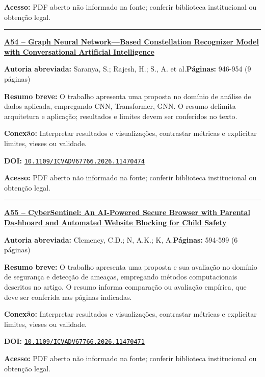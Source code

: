 \documentclass[10pt,a4paper]{article}
\begin{document}
\textbf{Acesso:} PDF aberto não informado na fonte; conferir biblioteca institucional ou obtenção legal.\par
\noindent\rule{\textwidth}{0.35pt}
\par\medskip\noindent
{\large\bfseries\href{https://doi.org/10.1109/ICVADV67766.2026.11470474}{A54 -- Graph Neural Network—Based Constellation Recognizer Model with Conversational Artificial Intelligence}}\par\smallskip
\textbf{Autoria abreviada:} Saranya, S.; Rajesh, H.; S., A. et al.\quad \textbf{Páginas:} 946-954 (9 páginas)\par
\textbf{Resumo breve:} O trabalho apresenta uma proposta no domínio de análise de dados aplicada, empregando CNN, Transformer, GNN. O resumo delimita arquitetura e aplicação; resultados e limites devem ser conferidos no texto.\par
\textbf{Conexão:} Interpretar resultados e visualizações, contrastar métricas e explicitar limites, vieses ou validade.\par
\textbf{DOI:} \href{https://doi.org/10.1109/ICVADV67766.2026.11470474}{\nolinkurl{10.1109/ICVADV67766.2026.11470474}}\par
\textbf{Acesso:} PDF aberto não informado na fonte; conferir biblioteca institucional ou obtenção legal.\par
\noindent\rule{\textwidth}{0.35pt}
\par\medskip\noindent
{\large\bfseries\href{https://doi.org/10.1109/ICVADV67766.2026.11470471}{A55 -- CyberSentinel: An AI-Powered Secure Browser with Parental Dashboard and Automated Website Blocking for Child Safety}}\par\smallskip
\textbf{Autoria abreviada:} Clemency, C.D.; N, A.K.; K, A.\quad \textbf{Páginas:} 594-599 (6 páginas)\par
\textbf{Resumo breve:} O trabalho apresenta uma proposta e sua avaliação no domínio de segurança e detecção de ameaças, empregando métodos computacionais descritos no artigo. O resumo informa comparação ou avaliação empírica, que deve ser conferida nas páginas indicadas.\par
\textbf{Conexão:} Interpretar resultados e visualizações, contrastar métricas e explicitar limites, vieses ou validade.\par
\textbf{DOI:} \href{https://doi.org/10.1109/ICVADV67766.2026.11470471}{\nolinkurl{10.1109/ICVADV67766.2026.11470471}}\par
\textbf{Acesso:} PDF aberto não informado na fonte; conferir biblioteca institucional ou obtenção legal.\par
\end{document}
